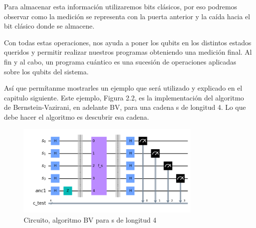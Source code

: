  Para almacenar esta información utilizaremos bits clásicos, por eso podremos observar como la medición se representa con la puerta anterior y la caída hacia el bit clásico donde se almacene. \newline
 
 Con todas estas operaciones, nos ayuda a poner los qubits en los distintos estados queridos y permitir realizar nuestros programas obteniendo una medición final. Al fin y al cabo, un programa cuántico es una sucesión de operaciones aplicadas sobre los qubits del sistema. \newline

  Así que permítanme mostrarles un ejemplo que será utilizado y explicado en el capitulo siguiente. Este ejemplo, Figura 2.2, es la implementación del algoritmo de Bernstein-Vazirani, en adelante BV, para una cadena s de longitud 4. Lo que debe hacer el algoritmo es descubrir esa cadena.

   \begin{figure}[H]
    \centering
    \includegraphics[width=0.8\textwidth]{TFG/imagenes/BV_circuito.png}
    \caption{Circuito, algoritmo BV para s de longitud 4}
    \label{Fig:CircuitoBV}
 \end{figure}


